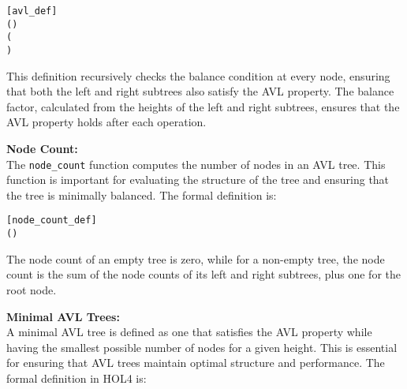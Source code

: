 \documentclass[12pt]{article}
\begin{document}
\begin{alltt}
[avl_def]
  \HOLTokenDefEquality{} 
 (     ) \HOLTokenDefEquality{}
  (  \HOLSymConst{=}   \HOLSymConst{\HOLTokenDisj{}}   \HOLSymConst{=}   \HOLSymConst{\ensuremath{+}}  \HOLSymConst{\HOLTokenDisj{}}
     \HOLSymConst{=}   \HOLSymConst{\ensuremath{+}} ) \HOLSymConst{\HOLTokenConj{}}  \HOLSymConst{=} \HOLSymConst{\&}  \HOLSymConst{\ensuremath{-}} \HOLSymConst{\&}  \HOLSymConst{\HOLTokenConj{}}
    \HOLSymConst{\HOLTokenConj{}}  
\end{alltt}

This definition recursively checks the balance condition at every node, ensuring that both the left and right subtrees also satisfy the AVL property. The balance factor, calculated from the heights of the left and right subtrees, ensures that the AVL property holds after each operation.

\textbf{Node Count:} \\
The \texttt{node\_count} function computes the number of nodes in an AVL tree. This function is important for evaluating the structure of the tree and ensuring that the tree is minimally balanced. The formal definition is:

\begin{alltt}
[node_count_def]
  \HOLTokenDefEquality{} 
 (     ) \HOLTokenDefEquality{}   \HOLSymConst{\ensuremath{+}}   \HOLSymConst{\ensuremath{+}} 
\end{alltt}

The node count of an empty tree is zero, while for a non-empty tree, the node count is the sum of the node counts of its left and right subtrees, plus one for the root node.

\textbf{Minimal AVL Trees:} \\
A minimal AVL tree is defined as one that satisfies the AVL property while having the smallest possible number of nodes for a given height. This is essential for ensuring that AVL trees maintain optimal structure and performance. The formal definition in HOL4 is:
\end{document}
